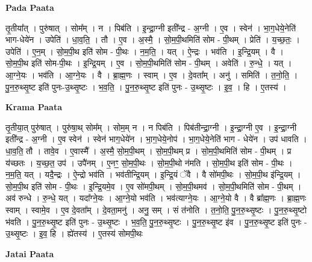 \documentclass[17pt]{extarticle}
\begin{document}
\textbf{Pada Paata} \newline

तृ॒तीया᳚त् । पुरु॑षात् । सोम᳚म् । न । पिब॑ति । इ॒न्द्रा॒ग्नी इती᳚न्द्र - अ॒ग्नी । ए॒व । स्वेन॑ । भा॒ग॒धेये॒नेति॑ भाग-धेये॑न । उपेति॑ । धा॒व॒ति॒ । तौ । ए॒व । अ॒स्मै॒ । सो॒म॒पी॒थमिति॑ सोम - पी॒थम् । प्रेति॑ । य॒च्छ॒तः॒ । उपेति॑ । ए॒न॒म् । सो॒म॒पी॒थ इति॑ सोम - पी॒थः । न॒म॒ति॒ । यत् । ऐ॒न्द्रः । भव॑ति । इ॒न्द्रि॒यम् । वै । सो॒म॒पी॒थ इति॑ सोम-पी॒थः । इ॒न्द्रि॒यम् । ए॒व । सो॒म॒पी॒थमिति॑ सोम - पी॒थम् । अवेति॑ । रु॒न्धे॒ । यत् । आ॒ग्ने॒यः । भव॑ति । आ॒ग्ने॒यः । वै । ब्रा॒ह्म॒णः । स्वाम् । ए॒व । दे॒वता᳚म् । अनु॑ । समिति॑ । त॒नो॒ति॒ । पु॒न॒रु॒थ्सृ॒ष्ट इति॑ पुनः-उ॒थ्सृ॒ष्टः । भ॒व॒ति॒ । पु॒न॒रु॒थ्सृ॒ष्ट इति॑ पुनः - उ॒थ्सृ॒ष्टः । इ॒व॒ । हि । ए॒तस्य॑ ।  \newline


\textbf{Krama Paata} \newline

तृ॒तीया॒त् पुरु॑षात् । पुरु॑षा॒थ् सोम᳚म् । सोम॒म् न । न पिब॑ति । पिब॑तीन्द्रा॒ग्नी । इ॒न्द्रा॒ग्नी ए॒व । इ॒न्द्रा॒ग्नी इती᳚न्द्र - अ॒ग्नी । ए॒व स्वेन॑ । स्वेन॑ भाग॒धेये॑न । भा॒ग॒धेये॒नोप॑ । भा॒ग॒धेये॒नेति॑ भाग - धेये॑न । उप॑ धावति । धा॒व॒ति॒ तौ । तावे॒व । ए॒वास्मै᳚ । अ॒स्मै॒ सो॒म॒पी॒थम् । सो॒म॒पी॒थम् प्र । सो॒म॒पी॒थमिति॑ सोम - पी॒थम् । प्र य॑च्छतः । य॒च्छ॒त॒ उप॑ । उपै॑नम् । ए॒नꣳ॒॒ सो॒म॒पी॒थः । सो॒म॒पी॒थो न॑मति । सो॒म॒पी॒थ इति॑ सोम - पी॒थः । न॒म॒ति॒ यत् । यदै॒न्द्रः । ऐ॒न्द्रो भव॑ति । भव॑तीन्द्रि॒यम् । इ॒न्द्रि॒यं ॅवै । वै सो॑मपी॒थः । सो॒म॒पी॒थ इ॑न्द्रि॒यम् । सो॒म॒पी॒थ इति॑ सोम - पी॒थः । इ॒न्द्रि॒यमे॒व । ए॒व सो॑मपी॒थम् । सो॒म॒पी॒थमव॑ । सो॒म॒पी॒थमिति॑ सोम - पी॒थम् । अव॑ रुन्धे । रु॒न्धे॒ यत् । यदा᳚ग्ने॒यः । आ॒ग्ने॒यो भव॑ति । भव॑त्याग्ने॒यः । आ॒ग्ने॒यो वै । वै ब्रा᳚ह्म॒णः । ब्रा॒ह्म॒णः स्वाम् । स्वामे॒व । ए॒व दे॒वता᳚म् । दे॒वता॒मनु॑ । अनु॒ सम् । सं त॑नोति । त॒नो॒ति॒ पु॒न॒रु॒थ्सृ॒ष्टः । पु॒न॒रु॒थ्सृ॒ष्टो भ॑वति । पु॒न॒रु॒थ्सृ॒ष्ट इति॑ पुनः - उ॒थ्सृ॒ष्टः । भ॒व॒ति॒ पु॒न॒रु॒थ्सृ॒ष्टः । पु॒न॒रु॒थ्सृ॒ष्ट इ॑व । पु॒न॒रु॒थ्सृ॒ष्ट इति॑ पुनः - उ॒थ्सृ॒ष्टः । इ॒व॒ हि । ह्ये॑तस्य॑ । ए॒तस्य॑ सोमपी॒थः \newline

\textbf{Jatai Paata} \newline
\end{document}
